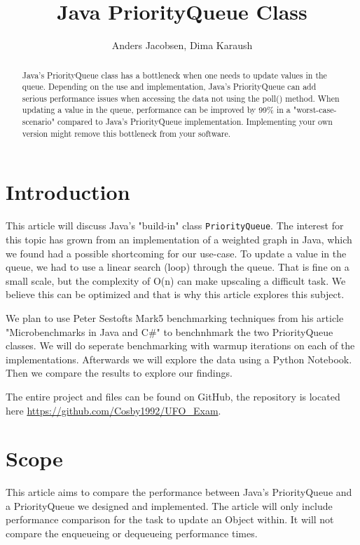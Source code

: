 \documentclass{article}
\title{Java PriorityQueue Class}
\author{Anders Jacobsen, Dima Karaush}
\begin{document}
\maketitle

\begin{abstract}
    Java's PriorityQueue class has a bottleneck when one needs to update values in the queue.
    Depending on the use and implementation, Java's PriorityQueue can add serious performance 
    issues when accessing the data not using the poll() method.
    When updating a value in the queue, performance can be improved by 99\% in a "worst-case-scenario" compared 
    to Java's PriorityQueue implementation. Implementing your own version might remove this 
    bottleneck from your software. 
\end{abstract}

\section{Introduction}
This article will discuss Java's "build-in" class \lstinline!PriorityQueue!. 
The interest for this topic has grown from an implementation of a weighted graph 
in Java, which we found had a possible shortcoming for our use-case. To update
a value in the queue, we had to use a linear search (loop) through the queue. 
That is fine on a small scale, but the complexity of O(n) can make upscaling a difficult task. 
We believe this can be optimized and that is why this article explores this subject.  

We plan to use Peter Sestofts Mark5 benchmarking techniques from his article 
"Microbenchmarks in Java and C\#" \cite{microbenchmarks7-8} to benchnhmark the two 
PriorityQueue classes. We will do seperate benchmarking with warmup iterations on 
each of the implementations. Afterwards we will explore the data using a Python
Notebook. Then we compare the results to explore our findings. 

The entire project and files can be found on GitHub, the repository is located here 
\url{https://github.com/Cosby1992/UFO_Exam}.


\section{Scope}
This article aims to compare the performance between Java's PriorityQueue
and a PriorityQueue we designed and implemented. The article will only include 
performance comparison for the task to update an Object within. It will not 
compare the enqueueing or dequeueing performance times.
\end{document}
